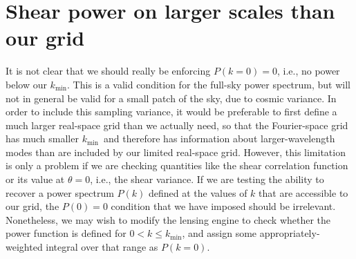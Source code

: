 \documentclass[preprint]{aastex}
\newcommand{\kmin}{\ensuremath{k_\mathrm{min}}}
\begin{document}
\section{Shear power on larger scales than our grid}\label{S:pk0}

It is not clear that we should really be enforcing $P(k=0)=0$, i.e., no
power below our \kmin.  This is a valid condition for the full-sky
power spectrum, but will not in general be valid for a small patch of
the sky, due to cosmic variance.  In order to include this sampling
variance, it would be preferable to first define a much larger
real-space grid than we actually need, so that the Fourier-space grid has much smaller
\kmin\ and therefore has information about larger-wavelength modes
than are included by our limited real-space grid.  However, this limitation is only a
problem if we are checking quantities like the shear correlation
function or its value at $\theta=0$, i.e., the shear variance.  If we
are testing the ability to recover a power spectrum $P(k)$ defined at
the values of $k$ that are accessible to our grid, the $P(0)=0$
condition that we have imposed should be irrelevant. 
Nonetheless, we may wish to modify the lensing engine to check whether
the power function is defined for $0< k\le\kmin$, and assign some
appropriately-weighted integral over that range as $P(k=0)$.
\end{document}
